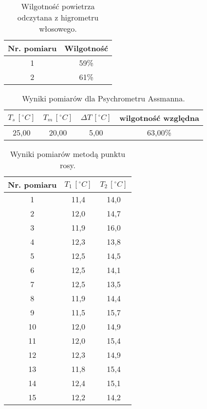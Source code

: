\documentclass[a4paper,12pt]{article}
\begin{document}
\begin{table}[H]
    \centering
    \begin{tabular}{|c|c|}
        \hline
        \textbf{Nr. pomiaru} & \textbf{Wilgotność} \\
        \hline
        1 & 59\% \\
        \hline
        2 & 61\% \\
        \hline
    \end{tabular}
    \caption{Wilgotność powietrza odczytana z higrometru włosowego.}
\end{table}

\begin{table}[H]
    \centering
    \begin{tabular}{|c|c|c|c|}
        \hline
        $T_s\,[^\circ C]$ & $T_m\,[^\circ C]$ & $\Delta T\,[^\circ C]$ & wilgotność względna \\
        \hline
        25{,}00 & 20{,}00 & 5{,}00 & 63{,}00\% \\
        \hline
    \end{tabular}
    \caption{Wyniki pomiarów dla Psychrometru Assmanna.}
\end{table}

\begin{table}[H]
    \centering
    \begin{tabular}{|c|c|c|}
        \hline
        Nr. pomiaru & $T_1\,[^\circ C]$ & $T_2\,[^\circ C]$ \\
        \hline
        1 & 11{,}4 & 14{,}0 \\
        \hline
        2 & 12{,}0 & 14{,}7 \\
        \hline
        3 & 11{,}9 & 16{,}0 \\
        \hline
        4 & 12{,}3 & 13{,}8 \\
        \hline
        5 & 12{,}5 & 14{,}5 \\
        \hline
        6 & 12{,}5 & 14{,}1 \\
        \hline
        7 & 12{,}5 & 13{,}5 \\
        \hline
        8 & 11{,}9 & 14{,}4 \\
        \hline
        9 & 11{,}5 & 15{,}7 \\
        \hline
        10 & 12{,}0 & 14{,}9 \\
        \hline
        11 & 12{,}0 & 15{,}4 \\
        \hline
        12 & 12{,}3 & 14{,}9 \\
        \hline
        13 & 11{,}8 & 15{,}4 \\
        \hline
        14 & 12{,}4 & 15{,}1 \\
        \hline
        15 & 12{,}2 & 14{,}2 \\
        \hline
    \end{tabular}
    \caption{Wyniki pomiarów metodą punktu rosy.}
\end{table}
\end{document}
